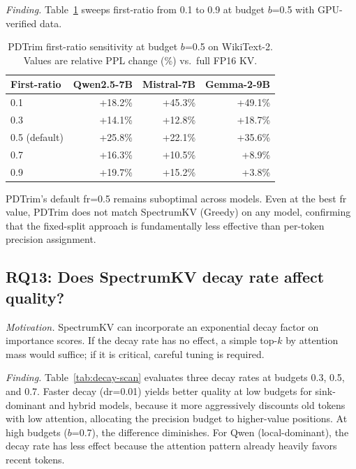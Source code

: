 \documentclass[11pt]{article}
\newcommand{\method}{SpectrumKV}
\newcommand{\pct}{\%}
\theoremstyle{definition}
\theoremstyle{plain}
\begin{document}
\emph{Finding.}  Table~\ref{tab:fr-scan} sweeps first-ratio from 0.1 to 0.9 at budget $b$=0.5 with GPU-verified data.

\begin{table}[t]
\centering
\caption{PDTrim first-ratio sensitivity at budget $b$=0.5 on WikiText-2.  Values are relative PPL change (\%) vs.\ full FP16 KV.}
\label{tab:fr-scan}
\small
\begin{tabular}{lrrr}
\toprule
First-ratio & Qwen2.5-7B & Mistral-7B & Gemma-2-9B \\
\midrule
0.1 & +18.2\pct{} & +45.3\pct{} & +49.1\pct{} \\
0.3 & +14.1\pct{} & +12.8\pct{} & +18.7\pct{} \\
0.5 (default) & +25.8\pct{} & +22.1\pct{} & +35.6\pct{} \\
0.7 & +16.3\pct{} & +10.5\pct{} & +8.9\pct{} \\
0.9 & +19.7\pct{} & +15.2\pct{} & +3.8\pct{} \\
\bottomrule
\end{tabular}
\end{table}

PDTrim's default fr=0.5 remains suboptimal across models.  Even at the best fr value, PDTrim does not match \method{} (Greedy) on any model, confirming that the fixed-split approach is fundamentally less effective than per-token precision assignment.

\subsection{RQ13: Does SpectrumKV decay rate affect quality?}
\label{sec:rq13}

\emph{Motivation.}  \method{} can incorporate an exponential decay factor on importance scores.  If the decay rate has no effect, a simple top-$k$ by attention mass would suffice; if it is critical, careful tuning is required.

\emph{Finding.}  Table~\ref{tab:decay-scan} evaluates three decay rates at budgets 0.3, 0.5, and 0.7.  Faster decay (dr=0.01) yields better quality at low budgets for sink-dominant and hybrid models, because it more aggressively discounts old tokens with low attention, allocating the precision budget to higher-value positions.  At high budgets ($b$=0.7), the difference diminishes.  For Qwen (local-dominant), the decay rate has less effect because the attention pattern already heavily favors recent tokens.
\end{document}

